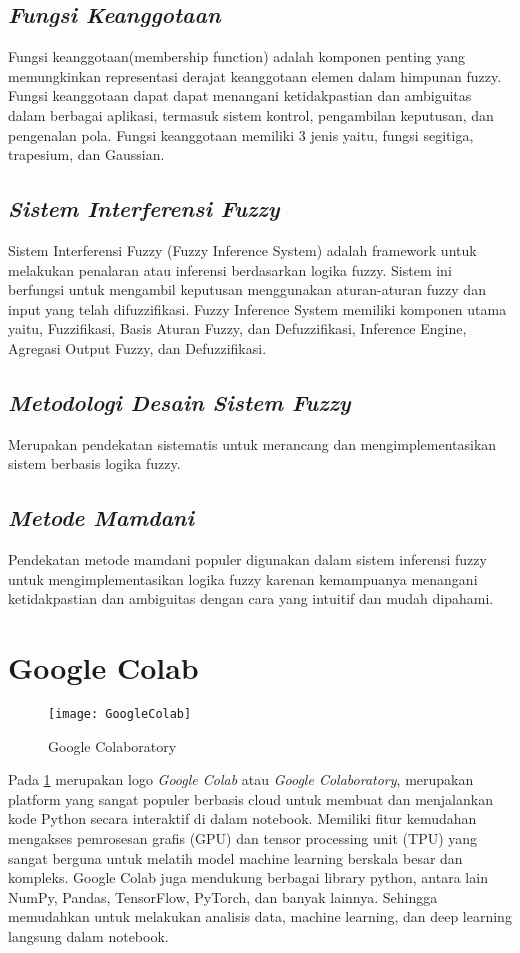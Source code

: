 \subsection{\textit{Fungsi Keanggotaan}}
Fungsi keanggotaan(membership function) adalah komponen penting yang memungkinkan representasi derajat keanggotaan elemen dalam himpunan fuzzy. Fungsi keanggotaan dapat dapat menangani  ketidakpastian dan ambiguitas dalam berbagai aplikasi, termasuk sistem kontrol, pengambilan keputusan, dan pengenalan pola. Fungsi keanggotaan memiliki 3 jenis yaitu, fungsi segitiga, trapesium, dan Gaussian.
\subsection{\textit{Sistem Interferensi Fuzzy}}
Sistem Interferensi Fuzzy (Fuzzy Inference System)  adalah framework untuk melakukan  penalaran atau inferensi berdasarkan logika fuzzy. Sistem ini berfungsi untuk mengambil keputusan menggunakan aturan-aturan fuzzy dan input yang telah difuzzifikasi.  Fuzzy Inference System memiliki komponen utama yaitu, Fuzzifikasi, Basis Aturan Fuzzy, dan 	Defuzzifikasi, Inference Engine, Agregasi Output Fuzzy, dan Defuzzifikasi.
\subsection{\textit{Metodologi Desain Sistem Fuzzy}}
Merupakan  pendekatan sistematis untuk merancang dan mengimplementasikan sistem berbasis logika fuzzy. 
\subsection{\textit{Metode Mamdani}}
Pendekatan metode mamdani populer digunakan dalam sistem inferensi fuzzy untuk mengimplementasikan logika fuzzy karenan kemampuanya menangani ketidakpastian dan ambiguitas dengan cara yang intuitif dan mudah dipahami. 

\section{Google Colab}
\begin{figure}[H]
	\centering
	\texttt{[image: GoogleColab]}
	\caption{Google Colaboratory}
	\label{fig:Google-Colaboratory}
\end{figure}

Pada \cref{fig:Google-Colaboratory} merupakan logo \textit{Google Colab} atau \textit{Google Colaboratory}, merupakan platform yang sangat populer berbasis cloud untuk membuat dan menjalankan kode Python secara interaktif di dalam notebook. Memiliki fitur kemudahan mengakses pemrosesan grafis (GPU) dan tensor processing unit (TPU) yang sangat berguna untuk melatih model machine learning berskala besar dan kompleks. Google Colab juga mendukung berbagai library python, antara lain  NumPy, Pandas, TensorFlow, PyTorch, dan banyak lainnya. Sehingga memudahkan untuk melakukan analisis data, machine learning, dan deep learning langsung dalam notebook. 

